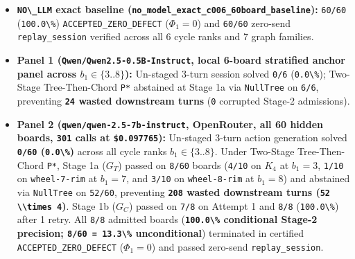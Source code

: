 \documentclass[
  11pt,
]{article}
\newcommand{\passthrough}[1]{#1}
\providecommand{\tightlist}{%
  \setlength{\itemsep}{0pt}\setlength{\parskip}{0pt}}
\begin{document}
\begin{itemize}
\tightlist
\item
  \textbf{\passthrough{\lstinline!NO\_LLM!} exact baseline
  (\nolinkurl{no_model_exact_c006_60board_baseline}):}
  \passthrough{\lstinline!60/60!} (\passthrough{\lstinline!100.0\%!})
  \nolinkurl{ACCEPTED_ZERO_DEFECT} (\(\Phi_1 = 0\)) and
  \passthrough{\lstinline!60/60!} zero-send \nolinkurl{replay_session}
  verified across all 6 cycle ranks and 7 graph families.
\item
  \textbf{Panel 1 (\nolinkurl{Qwen/Qwen2.5-0.5B-Instruct}, local 6-board
  stratified anchor panel across \(b_1 \in \{3..8\}\)):} Un-staged
  3-turn session solved \passthrough{\lstinline!0/6!}
  (\passthrough{\lstinline!0.0\%!}); Two-Stage Tree-Then-Chord
  \passthrough{\lstinline!P*!} abstained at Stage 1a via
  \passthrough{\lstinline!NullTree!} on \passthrough{\lstinline!6/6!},
  preventing \textbf{\passthrough{\lstinline!24!} wasted downstream
  turns} (\passthrough{\lstinline!0!} corrupted Stage-2 admissions).
\item
  \textbf{Panel 2 (\nolinkurl{qwen/qwen-2.5-7b-instruct}, OpenRouter,
  all 60 hidden boards, \passthrough{\lstinline!301!} calls at
  \passthrough{\lstinline!$0.097765!}):} Un-staged 3-turn action
  generation solved \textbf{\passthrough{\lstinline!0/60!}
  (\passthrough{\lstinline!0.0\%!})} across all cycle ranks
  \(b_1 \in \{3..8\}\). Under Two-Stage Tree-Then-Chord
  \passthrough{\lstinline!P*!}, Stage 1a (\(G_T\)) passed on
  \passthrough{\lstinline!8/60!} boards (\passthrough{\lstinline!4/10!}
  on \(K_4\) at \(b_1 = 3\), \passthrough{\lstinline!1/10!} on
  \passthrough{\lstinline!wheel-7-rim!} at \(b_1 = 7\), and
  \passthrough{\lstinline!3/10!} on
  \passthrough{\lstinline!wheel-8-rim!} at \(b_1 = 8\)) and abstained
  via \passthrough{\lstinline!NullTree!} on
  \passthrough{\lstinline!52/60!}, preventing
  \textbf{\passthrough{\lstinline!208!} wasted downstream turns
  (\passthrough{\lstinline!52 \\times 4!})}. Stage 1b (\(G_C\)) passed
  on \passthrough{\lstinline!7/8!} on Attempt 1 and
  \passthrough{\lstinline!8/8!} (\passthrough{\lstinline!100.0\%!})
  after 1 retry. All \passthrough{\lstinline!8/8!} admitted boards
  (\textbf{\passthrough{\lstinline!100.0\%!} conditional Stage-2
  precision; \passthrough{\lstinline!8/60 = 13.3\%!} unconditional})
  terminated in certified \nolinkurl{ACCEPTED_ZERO_DEFECT}
  (\(\Phi_1 = 0\)) and passed zero-send \nolinkurl{replay_session}.
\end{itemize}
\end{document}
